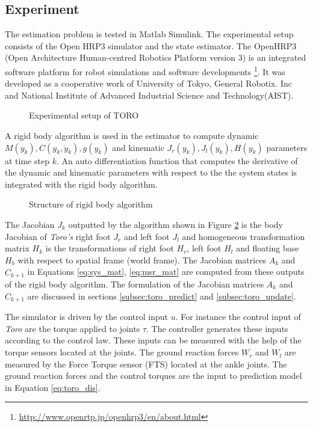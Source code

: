 \subsection{Experiment}
\label{subsec:toro_exp}
The estimation problem is tested in Matlab Simulink. The experimental setup consists of the Open HRP3 simulator and the state estimator. The OpenHRP3 (Open Architecture Human-centred Robotics Platform version 3) is an integrated software platform for robot simulations and software developments \footnote{\url{http://www.openrtp.jp/openhrp3/en/about.html}}. It was developed as a cooperative work of University of Tokyo, General Robotix. Inc and National Institute of Advanced Industrial Science and Technology(AIST).

\begin{figure}[H]
    \centering
    
    \caption{Experimental setup of TORO}
    \label{fig:toro_exp}
\end{figure}

A rigid body algorithm is used in the estimator to compute dynamic $M(y_k), C(y_k,\dot y_k), g(y_k)$ and kinematic $J_r(y_k), J_l(y_k), H(y_k)$ parameters at time step $k$. An auto differentiation function that computes the derivative of the dynamic and kinematic parameters with respect to the the system states is integrated with the rigid body algorithm. 
\begin{figure}[H]
    \centering
    
    \caption{Structure of rigid body algorithm}
    \label{fig:luc_dyn}
\end{figure}
The Jacobian $J_k$ outputted by the algorithm shown in Figure \ref{fig:luc_dyn} is the body Jacobian of \emph{Toro's} right foot $J_r$ and left foot $J_l$ and homogeneous transformation matrix $H_k$ is the transformations of right foot $H_r$, left foot $H_l$ and floating base $H_b$ with respect to spatial frame (world frame).
The Jacobian matrices $A_k$ and $\hat C_{k+1}$ in Equations \ref{eq:sys_mat}, \ref{eq:msr_mat} are computed from these outputs of the rigid body algorithm. The formulation of the Jacobian matrices $A_k$ and $\hat C_{k+1}$ are discussed in sections \ref{subsec:toro_predict} and \ref{subsec:toro_update}. 

The simulator is driven by the control input $u$. For instance the control input of \emph{Toro} are the torque applied to joints $\tau$. The controller generates these inputs according to the control law. These inputs can be measured with the help of the torque sensors located at the joints. The ground reaction forces $W_r$ and $W_l$ are measured by the Force Torque sensor (FTS) located at the ankle joints. The ground reaction forces and the control torques are the input to prediction model in Equation \ref{eq:toro_dis}.

